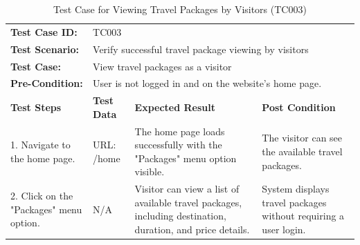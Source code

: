 \documentclass{scrreprt}
\begin{document}
\begin{longtable}{| m{2cm} | m{5cm} | m{4cm} | m{3cm} |}
\caption{Test Case for Viewing Travel Packages by Visitors (TC003)}
\vspace{0.5cm} \\ \hline
\textbf{Test Case ID:} & \multicolumn{3}{l|}{TC003} \\ \hline
\textbf{Test Scenario:} & \multicolumn{3}{l|}{Verify successful travel package viewing by visitors} \\ \hline
\textbf{Test Case:} & \multicolumn{3}{l|}{View travel packages as a visitor} \\ \hline
\textbf{Pre-Condition:} & \multicolumn{3}{l|}{User is not logged in and on the website's home page.} \\ \hline
\textbf{Test Steps} & \textbf{Test Data} & \textbf{Expected Result} & \textbf{Post Condition} \\ \hline
1. Navigate to the home page. & URL: /home & The home page loads successfully with the "Packages" menu option visible. & The visitor can see the available travel packages. \\ \hline
2. Click on the "Packages" menu option. & N/A & Visitor can view a list of available travel packages, including destination, duration, and price details. & System displays travel packages without requiring a user login. \\ \hline
\end{longtable}

\vspace{1cm}
\end{document}
